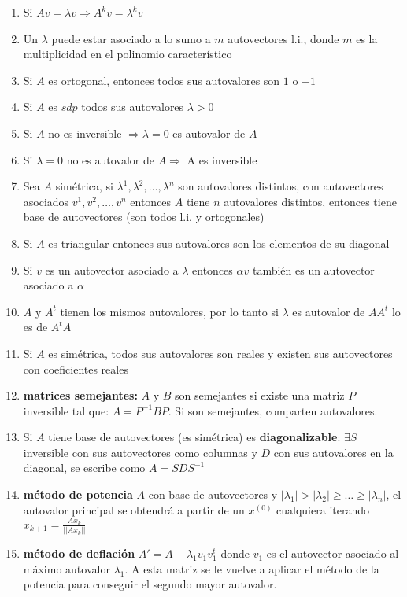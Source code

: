 \begin{enumerate}
    \item Si $Av = \lambda v \Rightarrow A^kv = \lambda^k v$
    \item Un $\lambda$ puede estar asociado a lo sumo a $m$ autovectores l.i., donde $m$ es la multiplicidad en el polinomio característico
    \item Si $A$ es ortogonal, entonces todos sus autovalores son $1$ o $-1$
    \item Si $A$ es $sdp$ todos sus autovalores $\lambda > 0$ 
    \item Si $A$ no es inversible $\Rightarrow \lambda = 0$ es autovalor de $A$
    \item Si $\lambda = 0$ no es autovalor de $A \Rightarrow$ A es inversible
    \item Sea $A$ simétrica, si $\lambda^1, \lambda^2, \dots, \lambda^n$ son autovalores distintos, con autovectores asociados $v^1, v^2, \dots, v^n$ entonces $A$ tiene $n$ autovalores distintos, entonces tiene base de autovectores (son todos l.i. y ortogonales)
    \item Si $A$ es triangular entonces sus autovalores son los elementos de su diagonal
    \item Si $v$ es un autovector asociado a $\lambda$ entonces $\alpha v$ también es un autovector asociado a $\alpha$
    \item $A$ y $A^t$ tienen los mismos autovalores, por lo tanto si $\lambda$ es autovalor de $AA^t$ lo es de $A^tA$ 
    \item Si $A$ es simétrica, todos sus autovalores son reales y existen sus autovectores con coeficientes reales
    \item \textbf{matrices semejantes:} $A$ y $B$ son semejantes si existe una matriz $P$ inversible tal que: $A = P^{-1}BP$. Si son semejantes, comparten autovalores. 
    \item Si $A$ tiene base de autovectores (es simétrica) es \textbf{diagonalizable}: $\exists S$ inversible con sus autovectores como columnas  y $D$ con sus autovalores en la diagonal, se escribe como $A = SDS^{-1}$
    \item \textbf{método de potencia} $A$ con base de autovectores y $|\lambda_1| > |\lambda_2| \geq \dots \geq |\lambda_n|$, el autovalor principal se obtendrá a partir de un $x^{(0)}$ cualquiera iterando $x_{k+1} = \frac{Ax_k}{||Ax_k||}$
    \item \textbf{método de deflación} $A' = A - \lambda_1 v_1 v_1^t$ donde $v_1$ es el autovector asociado al máximo autovalor $\lambda_1$. A esta matriz se le vuelve a aplicar el método de la potencia para conseguir el segundo mayor autovalor.
    
\end{enumerate}

